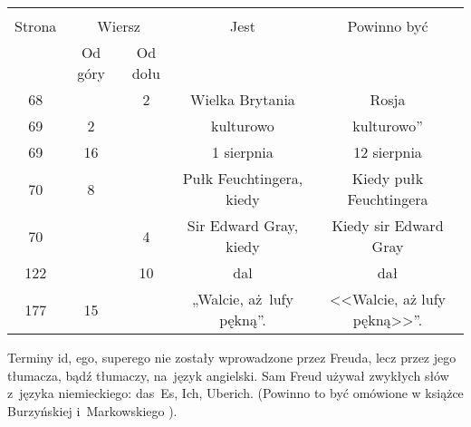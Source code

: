 \documentclass[a4paper,11pt]{article}
\begin{document}


\begin{center}

  \begin{tabular}{|c|c|c|c|c|}
    \hline
    & \multicolumn{2}{c|}{} & & \\
    Strona & \multicolumn{2}{c|}{Wiersz} & Jest
                              & Powinno być \\ \cline{2-3}
    & Od góry & Od dołu & & \\
    \hline
    68  & &  2 & Wielka Brytania & Rosja \\
    69  &  2 & & kulturowo & kulturowo'' \\
    69  & 16 & & 1 sierpnia & 12 sierpnia \\
    70  &  8 & & Pułk Feuchtingera, kiedy & Kiedy pułk Feuchtingera \\
    70  & &  4 & Sir Edward Gray, kiedy & Kiedy sir Edward Gray \\
    122 & & 10 & dal & dał \\
    177 & 15 & & „Walcie, aż~lufy pękną”. & <<Walcie, aż lufy pękną>>”. \\
    \hline
  \end{tabular}

\end{center}


\vspace{\spaceTwo}














\start {} Terminy id, ego, superego nie zostały wprowadzone
przez Freuda, lecz przez jego tłumacza, bądź tłumaczy, na~język
angielski. Sam Freud używał zwykłych słów z~języka niemieckiego:
das~Es, Ich, Uberich. (Powinno to być omówione w książce Burzyńskiej
i~Markowskiego \cite{BM09}).
\end{document}
